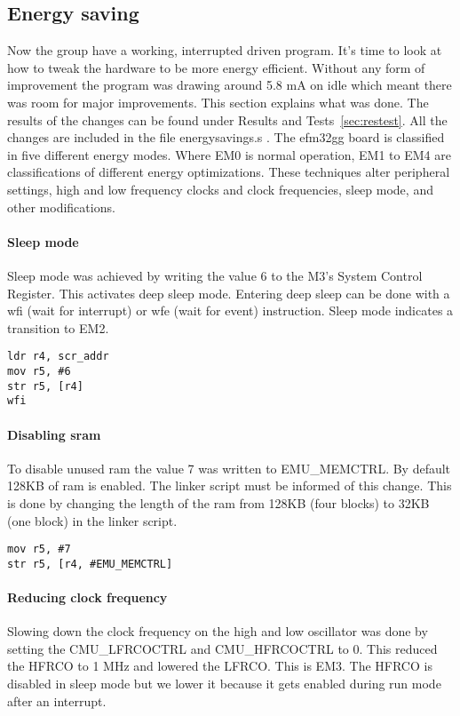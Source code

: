 \subsection{Energy saving}
Now the group have a working, interrupted driven program. It’s time to look at how to tweak the hardware to be more energy efficient. Without any form of improvement the program was drawing around 5.8 mA on idle which meant there was room for major improvements. This section explains what was done. The results of the changes can be found under Results and Tests~\ref{sec:restest}. All the changes are included in the file energysavings.s \cite{energysavings}. The efm32gg board is classified in five different energy modes. Where EM0 is normal operation, EM1 to EM4 are classifications of different energy optimizations. These techniques alter peripheral settings, high and low frequency clocks and clock frequencies, sleep mode, and other modifications. 

\paragraph{Sleep mode}
Sleep mode was achieved by writing the value 6 to the M3’s System Control Register. This activates deep sleep mode. Entering deep sleep can be done with a wfi (wait for interrupt) or wfe (wait for event) instruction. Sleep mode indicates a transition to EM2.
\begin{lstlisting}
ldr r4, scr_addr
mov r5, #6
str r5, [r4]
wfi
\end{lstlisting}

\paragraph{Disabling sram}
To disable unused ram the value 7 was written to EMU\_MEMCTRL. By default 128KB of ram is enabled. The linker script must be informed of this change. This is done by changing the length of the ram from 128KB (four blocks) to 32KB (one block) in the linker script\cite{linker}. 

\begin{lstlisting}
mov r5, #7
str r5, [r4, #EMU_MEMCTRL]
\end{lstlisting}


\paragraph{Reducing clock frequency}
Slowing down the clock frequency on the high and low oscillator was done by setting the CMU\_LFRCOCTRL and CMU\_HFRCOCTRL to 0. This reduced the HFRCO to 1 MHz and lowered the LFRCO. This is EM3. The HFRCO is disabled in sleep mode but we lower it because it gets enabled during run mode after an interrupt.

